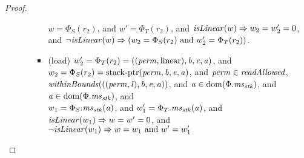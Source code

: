 \documentclass[a4paper]{article}
\begin{document}
\begin{proof}
\begin{itemize}
\begin{itemize}
\begin{itemize}
      $w = \Phi_S(r_2)$, and $w' = \Phi_T(r_2)$, and $\isLinear{w} \Rightarrow
      w_2 = w_2' = 0$, and $\neg \isLinear{w} \Rightarrow (w_2 = \Phi_S(r_2)
      \text{ and } w_2' = \Phi_T(r_2))$.
    \item (load) $ w_2' = \Phi_T(r_2) =
      ((\mathit{perm},\mathrm{linear}),\mathit{b},\mathit{e},\mathit{a})$, and $w_2 = \Phi_S(r_2) = \mathrm{stack\text{-}ptr}(\mathit{perm},\mathit{b},\mathit{e},\mathit{a})$, and $\perm \in \readAllowed{}$,
      $\withinBounds{((\perm,\lin),\baddr,\eaddr,\aaddr)}$, and $\mathit{a} \in
      \mathrm{dom}(\Phi.\mathit{ms}_{\mathit{stk}})$, and $\mathit{a} \in \mathrm{dom}(\Phi.\mathit{ms}_{\mathit{stk}})$, and\\
      $w_1 = \Phi_S.\mathit{ms}_{\mathit{stk}}(\mathit{a})$, and $w_1' = \Phi_T.\mathit{ms}_{\mathit{stk}}(\mathit{a})$, and \\
      $\isLinear{w_1} \Rightarrow w = w' = 0$, and \\
      $\neg \isLinear{w_1} \Rightarrow w = w_1 \text{ and } w' = w_1'$
    \end{itemize}
  \end{itemize}


\end{itemize}
\end{proof}
\end{document}

